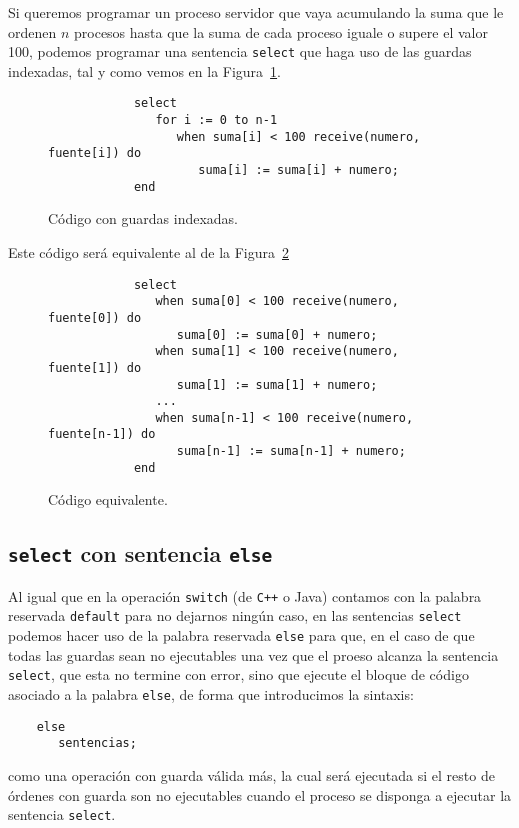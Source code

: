 \begin{ejemplo}
    Si queremos programar un proceso servidor que vaya acumulando la suma que le ordenen $n$ procesos hasta que la suma de cada proceso iguale o supere el valor 100, podemos programar una sentencia \verb|select| que haga uso de las guardas indexadas, tal y como vemos en la Figura~\ref{fig:cod_guardas_indexadas}.
    \begin{figure}[H]
        \centering
        \begin{verbatim}
            select
               for i := 0 to n-1
                  when suma[i] < 100 receive(numero, fuente[i]) do
                     suma[i] := suma[i] + numero;
            end
        \end{verbatim}
        \caption{Código con guardas indexadas.}
        \label{fig:cod_guardas_indexadas}
    \end{figure}
    Este código será equivalente al de la Figura~\ref{fig:cod_guardas_indexadas_equiv}
    \begin{figure}[H]
        \centering
        \begin{verbatim}
            select
               when suma[0] < 100 receive(numero, fuente[0]) do
                  suma[0] := suma[0] + numero;
               when suma[1] < 100 receive(numero, fuente[1]) do
                  suma[1] := suma[1] + numero;
               ...
               when suma[n-1] < 100 receive(numero, fuente[n-1]) do
                  suma[n-1] := suma[n-1] + numero;
            end
        \end{verbatim}
        \caption{Código equivalente.}
        \label{fig:cod_guardas_indexadas_equiv}
    \end{figure}
\end{ejemplo}

\subsection{\texttt{select} con sentencia \texttt{else}}
Al igual que en la operación \verb|switch| (de \verb|C++| o Java) contamos con la palabra reservada \verb|default| para no dejarnos ningún caso, en las sentencias \verb|select| podemos hacer uso de la palabra reservada \verb|else| para que, en el caso de que todas las guardas sean no ejecutables una vez que el proeso alcanza la sentencia \verb|select|, que esta no termine con error, sino que ejecute el bloque de código asociado a la palabra \verb|else|, de forma que introducimos la sintaxis:
\begin{verbatim}
    else
       sentencias;
\end{verbatim}
como una operación con guarda válida más, la cual será ejecutada si el resto de órdenes con guarda son no ejecutables cuando el proceso se disponga a ejecutar la sentencia \verb|select|.

